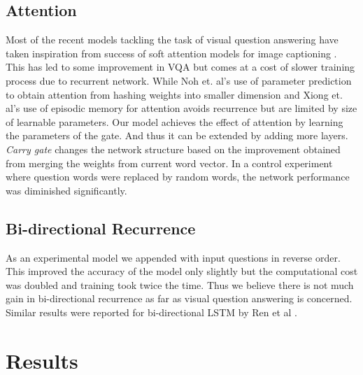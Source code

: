 \subsection{Attention}
Most of the recent models \cite{xiong2016dynamic} \cite{xu2015ask} \cite{yang2015stacked} tackling the task of visual question answering have taken inspiration from success of soft attention models for image captioning\cite{karpathy2015deep} \cite{xu2015show}. This has led to some improvement in VQA but comes at a cost of slower training process due to recurrent network. While Noh et. al's \cite{noh2015image} use of parameter prediction to obtain attention from hashing weights into smaller dimension and Xiong et. al's\cite{xiong2016dynamic} use of episodic memory for attention avoids recurrence but are limited by size of learnable parameters. Our model achieves the effect of attention by learning the parameters of the gate. And thus it can be extended by adding more layers. \textit{Carry gate} changes the network structure based on the improvement obtained from merging the weights from current word vector.  In a control experiment where question words were replaced by random words, the network performance was diminished significantly.

\subsection{Bi-directional Recurrence}
As an experimental model we appended with input questions in reverse order. This improved the accuracy of the model only slightly but the computational cost was doubled and training took twice the time. Thus we believe there is not much gain in bi-directional recurrence as far as visual question answering is concerned. Similar results were reported for bi-directional LSTM by Ren et al \cite{ren2015exploring}.

\section{Results}

